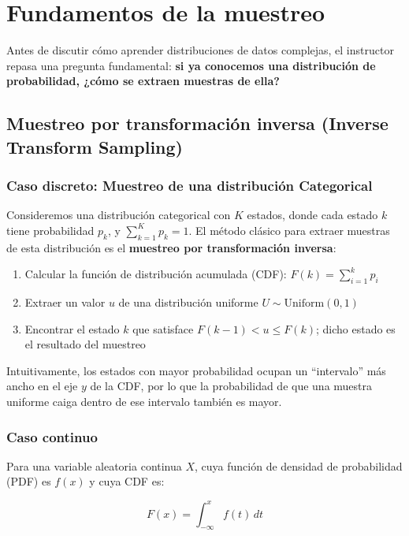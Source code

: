 \section{Fundamentos de la muestreo}

Antes de discutir cómo aprender distribuciones de datos complejas, el instructor repasa una pregunta fundamental: \textbf{si ya conocemos una distribución de probabilidad, ¿cómo se extraen muestras de ella?}

\subsection{Muestreo por transformación inversa (Inverse Transform Sampling)}

\subsubsection{Caso discreto: Muestreo de una distribución Categorical}

Consideremos una distribución categorical con $K$ estados, donde cada estado $k$ tiene probabilidad $p_k$, y $\sum_{k=1}^K p_k = 1$. El método clásico para extraer muestras de esta distribución es el \textbf{muestreo por transformación inversa}:

\begin{enumerate}
    \item Calcular la función de distribución acumulada (CDF): $F(k) = \sum_{i=1}^{k} p_i$
    \item Extraer un valor $u$ de una distribución uniforme $U \sim \text{Uniform}(0, 1)$
    \item Encontrar el estado $k$ que satisface $F(k-1) < u \leq F(k)$; dicho estado es el resultado del muestreo
\end{enumerate}

Intuitivamente, los estados con mayor probabilidad ocupan un ``intervalo'' más ancho en el eje $y$ de la CDF, por lo que la probabilidad de que una muestra uniforme caiga dentro de ese intervalo también es mayor.

\subsubsection{Caso continuo}

Para una variable aleatoria continua $X$, cuya función de densidad de probabilidad (PDF) es $f(x)$ y cuya CDF es:

$$F(x) = \int_{-\infty}^{x} f(t) \, dt$$

